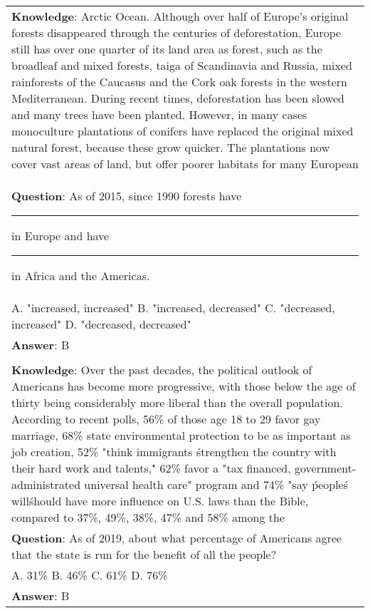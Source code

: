 \documentclass[nohyperref]{article}
\newcommand*{\xdash}[1][3em]{\rule{1cm}{0.15mm}{}}
\theoremstyle{plain}
\theoremstyle{definition}
\theoremstyle{remark}
\begin{document}
%
 







\newpage


\appendix
\onecolumn

\begin{table*}
\small
\begin{tabularx}{\textwidth}{m{17cm}}
\toprule
\textbf{Knowledge}: Arctic Ocean. Although over half of Europe's original forests disappeared through the centuries of deforestation, Europe still has over one quarter of its land area as forest, such as the broadleaf and mixed forests, taiga of Scandinavia and Russia, mixed rainforests of the Caucasus and the Cork oak forests in the western Mediterranean. During recent times, deforestation has been slowed and many trees have been planted. However, in many cases monoculture plantations of conifers have replaced the original mixed natural forest, because these grow quicker. The plantations now cover vast areas of land, but offer poorer habitats for many European \\ 
\textbf{Question}: As of 2015, since 1990 forests have \xdash in Europe and have \xdash in Africa and the Americas. \\
A. "increased, increased"
B. "increased, decreased"
C. "decreased, increased"
D. "decreased, decreased" \\
\textbf{Answer}: B \\
\\
\textbf{Knowledge}: Over the past decades, the political outlook of Americans has become more progressive, with those below the age of thirty being considerably more liberal than the overall population. According to recent polls, 56\% of those age 18 to 29 favor gay marriage, 68\% state environmental protection to be as important as job creation, 52\% "think immigrants \'strengthen the country with their hard work and talents,\'" 62\% favor a "tax financed, government-administrated universal health care" program and 74\% "say \'people\'s will\' should have more influence on U.S. laws than the Bible, compared to 37\%, 49\%, 38\%, 47\% and 58\% among the \\ 
\textbf{Question}: As of 2019, about what percentage of Americans agree that the state is run for the benefit of all the people? \\
A. 31\%
B. 46\%
C. 61\%
D. 76\% \\
\textbf{Answer}: B \\

\end{tabularx}
\end{table*}
\end{document}
